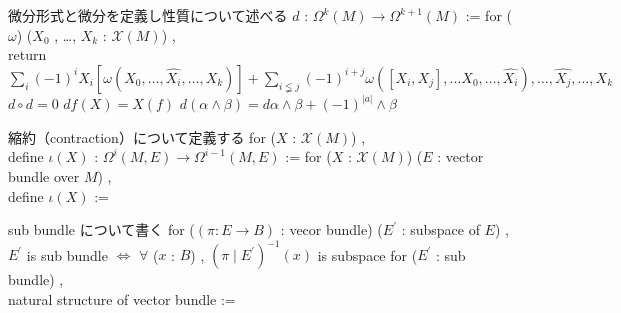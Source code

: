 \begin{Proof}
\itemprof
  \WIP
\itemprof
  \WIP
\end{Proof}

\begin{Definition}
\itemnote
  微分形式と微分を定義し性質について述べる
\itemdefi
  \(d\) : \(\Omega^{k}(M) \to \Omega^{k + 1}(M)\) :=
  for (\(\omega\)) (\(X_0\) , \ldots , \(X_k\) : \(\mathcal{X}(M)\)) ,\\
  return \(\sum_i (-1)^i X_i[\omega(X_0 , \ldots , \hat{X_i} , \ldots , X_k)] + \sum_{i \lneqq j} (-1)^{i + j} \omega([X_i , X_j] , \ldots X_0 , \ldots , \hat{X_i}) , \ldots , \hat{X_j} , \ldots , X_k\)
\itemprop
  \(d \circ d = 0\)
\itemprop
  \(df (X) = X(f)\)
\itemprop
  \(d (\alpha \wedge \beta) = d \alpha \wedge \beta + (-1)^{|a|} \wedge \beta\)
\end{Definition}

\begin{Definition}
\itemnote
  縮約（contraction）について定義する
\itemdefi
  for (\(X\) : \(\mathcal{X}(M)\)) ,\\
  define \(\iota(X)\) : \(\Omega^i(M , E) \to \Omega^{i - 1}(M ,E)\) := 
\itemdefi
  for (\(X\) : \(\mathcal{X}(M)\)) (\(E\) : vector bundle over \(M\)) ,\\
  define \(\iota(X)\) := 
\end{Definition}

\begin{Definition}
\itemnote
  sub bundle について書く
\itemdefi
  for (\((\pi : E \to B)\) : vecor bundle) (\(E^{\prime}\) : subspace of \(E\)) ,\\
  \(E^{\prime}\) is sub bundle \(\iff\) \(\forall\) (\(x\) : \(B\)) , \((\pi \mid E^{\prime})^{-1}(x)\) is subspace
\itemdefi
  for (\(E^{\prime}\) : sub bundle) ,\\
  natural structure of vector bundle := 
\end{Definition}